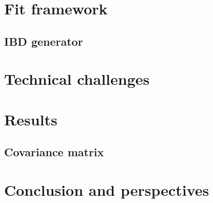 \documentclass[../main.tex]{subfiles}
\begin{document}
\section{Fit framework}
\label{sec:joint_fit:framework}
%
%
%
%
\subsection{IBD generator}
\label{sec:joint_fit:ibd-gen}
%

\section{Technical challenges}
\label{sec:joint_fit:tech}
%
%
%

\section{Results}
\label{sec:joint_fit:results}
%
%
%
%
%
%
\subsection{Covariance matrix}
\label{sec:joint_fit:cov_mat}

%
%
%
%
%

\section{Conclusion and perspectives}
\label{sec:joint_fit:conclusion}
\end{document}
